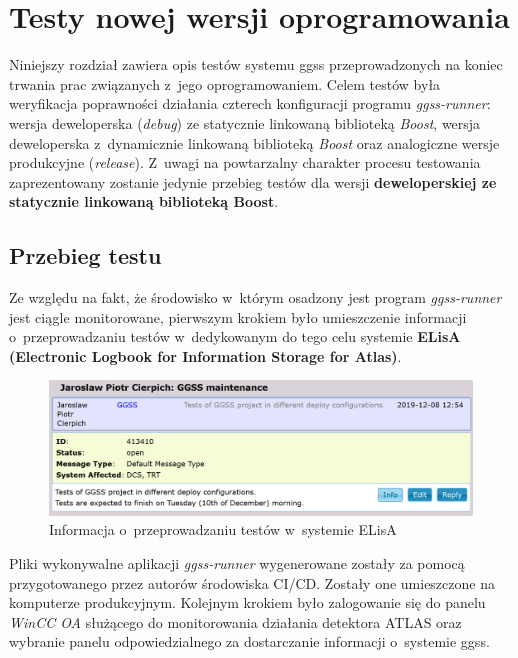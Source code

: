 \chapter{Testy nowej wersji oprogramowania}
\label{cha:test}
Niniejszy rozdział zawiera opis testów systemu \gls*{ggss} przeprowadzonych na koniec trwania prac związanych z~jego oprogramowaniem. Celem testów była weryfikacja poprawności działania czterech konfiguracji programu \textit{ggss-runner}: wersja deweloperska (\textit{debug}) ze statycznie linkowaną biblioteką \textit{Boost}, wersja deweloperska z~dynamicznie linkowaną biblioteką \textit{Boost} oraz analogiczne wersje produkcyjne (\textit{release}). Z~uwagi na powtarzalny charakter procesu testowania zaprezentowany zostanie jedynie przebieg testów dla wersji \textbf{deweloperskiej ze statycznie linkowaną biblioteką Boost}. 

\section{Przebieg testu}
Ze względu na fakt, że środowisko w~którym osadzony jest program \textit{ggss-runner} jest ciągle monitorowane, pierwszym krokiem było umieszczenie informacji o~przeprowadzaniu testów w~dedykowanym do tego celu systemie \textbf{ELisA (Electronic Logbook for Information Storage for Atlas)}.

\begin{figure}[H]
\centering
\includegraphics[width=\textwidth]{res/png/elisa}
\caption{Informacja o~przeprowadzaniu testów w~systemie ELisA}
\label{fig:elisa}
\end{figure}

Pliki wykonywalne aplikacji \textit{ggss-runner} wygenerowane zostały za pomocą przygotowanego przez autorów środowiska CI/CD. Zostały one umieszczone na komputerze produkcyjnym. Kolejnym krokiem było zalogowanie się do panelu \textit{WinCC OA} służącego do monitorowania działania detektora ATLAS oraz wybranie panelu odpowiedzialnego za dostarczanie informacji o~systemie \gls*{ggss}. 

